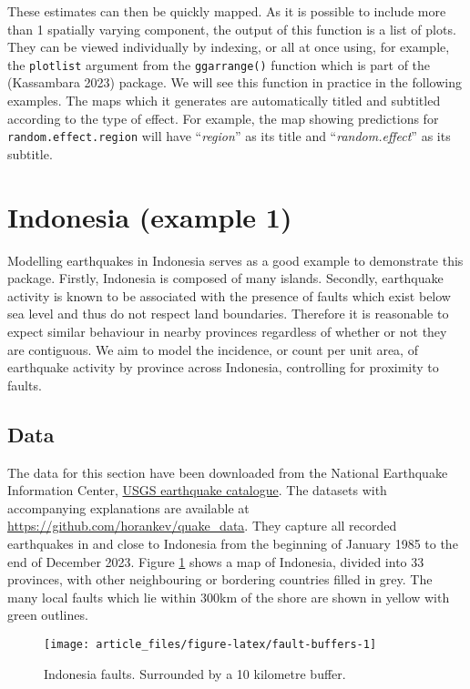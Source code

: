 These estimates can then be quickly mapped. As it is possible to include more than 1 spatially varying component, the output of this function is a list of plots. They can be viewed individually by indexing, or all at once using, for example, the \texttt{plotlist} argument from the \texttt{ggarrange()} function which is part of the  (Kassambara 2023) package. We will see this function in practice in the following examples. The maps which it generates are automatically titled and subtitled according to the type of effect. For example, the map showing predictions for \texttt{random.effect.region} will have ``\emph{region}'' as its title and ``\emph{random.effect}'' as its subtitle.

\hypertarget{indonesia-example-1}{%
\section{Indonesia (example 1)}\label{indonesia-example-1}}

Modelling earthquakes in Indonesia serves as a good example to
demonstrate this package. Firstly, Indonesia is composed of many
islands. Secondly, earthquake activity is known to be associated with
the presence of faults which exist below sea level and thus do not
respect land boundaries. Therefore it is reasonable to expect similar
behaviour in nearby provinces regardless of whether or not they are
contiguous. We aim to model the incidence, or count per unit area, of earthquake activity by
province across Indonesia, controlling for proximity to faults.

\hypertarget{data}{%
\subsection{Data}\label{data}}

The data for this section have been downloaded from the National Earthquake Information Center, \href{https://earthquake.usgs.gov/earthquakes/search/}{USGS earthquake
catalogue}. The
datasets with accompanying explanations are available at
\url{https://github.com/horankev/quake_data}. They capture all recorded earthquakes in
and close to Indonesia from the beginning of January 1985 to the end of December 2023. Figure \ref{fig:fault-buffers} shows a map of Indonesia, divided into 33 provinces, with other neighbouring or bordering countries filled in grey. The many local
faults which lie within 300km of the shore are shown in yellow with green outlines.

\begin{figure}

{\centering \texttt{[image: article\_files/figure-latex/fault-buffers-1]} 

}

\caption{Indonesia faults. Surrounded by a 10 kilometre buffer. }\label{fig:fault-buffers}
\end{figure}

